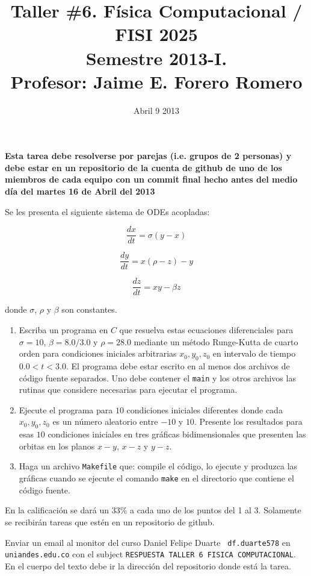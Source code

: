 \documentclass{article}
\title{Taller \#6. F\'isica Computacional / FISI 2025 \\Semestre
  2013-I. \\ Profesor: Jaime E. Forero Romero}
\date{Abril 9 2013}
\begin{document}
\maketitle

{\bf Esta tarea debe resolverse por parejas (i.e. grupos de 2
  personas) y debe estar en un repositorio de la cuenta de github de
  uno de los miembros de cada equipo con un commit final hecho antes del
  medio d\'ia del martes 16 de Abril del 2013}  

Se les presenta el siguiente sistema de ODEs acopladas:

\begin{equation}
\frac{dx}{dt} = \sigma(y-x)
\end{equation}

\begin{equation}
\frac{dy}{dt} = x(\rho -z) - y
\end{equation}

\begin{equation}
\frac{dz}{dt} = xy -\beta z
\end{equation}

donde $\sigma$, $\rho$ y $\beta$ son constantes.

\begin{enumerate}
\item 
Escriba un programa en $C$ que resuelva estas ecuaciones diferenciales para $\sigma=10$, $\beta=8.0/3.0$ y $\rho=28.0$ mediante un m\'etodo Runge-Kutta de cuarto orden para condiciones iniciales arbitrarias $x_0,y_0,z_0$ en intervalo de tiempo $0.0<t<3.0$. El programa debe estar escrito en al menos dos archivos de c\'odigo fuente separados. Uno debe contener el \verb"main" y los otros archivos las rutinas que considere necesarias para ejecutar el programa. 

\item 
Ejecute el programa para $10$ condiciones iniciales diferentes donde cada  $x_0,y_0,z_0$ es un n\'umero aleatorio entre $-10$ y $10$. Presente los resultados para esas $10$ condiciones iniciales en tres gr\'aficas bidimensionales que presenten las orbitas en los planos $x-y$, $x-z$ y $y-z$.

\item 
Haga un archivo \verb"Makefile" que: compile el c\'odigo, lo ejecute y produzca las gr\'aficas cuando se ejecute el comando \verb"make" en el directorio que contiene el c\'odigo fuente.

\end{enumerate}

En la calificaci\'on se dar\'a un 33\% a cada uno de los puntos del 1 al 3. Solamente se recibir\'an tareas que est\'en en un repositorio de github.


Enviar un email al monitor del curso Daniel Felipe Duarte {\tt
  df.duarte578} en {\tt uniandes.edu.co} con el subject
\verb"RESPUESTA TALLER 6 FISICA COMPUTACIONAL". En el cuerpo del texto
debe ir la direcci\'on del repositorio donde est\'a la tarea. 
\end{document}
